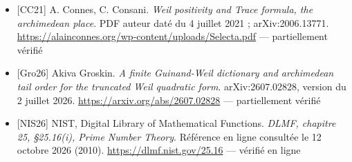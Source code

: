 \documentclass[
  10pt,
  a4paper,
]{article}
\providecommand{\tightlist}{%
  \setlength{\itemsep}{0pt}\setlength{\parskip}{0pt}}
\begin{document}
\begin{itemize}
\tightlist
\item
  {[}CC21{]} A. Connes, C. Consani. \emph{Weil positivity and Trace
  formula, the archimedean place}. PDF auteur daté du 4 juillet 2021 ;
  arXiv:2006.13771.
  \url{https://alainconnes.org/wp-content/uploads/Selecta.pdf} ---
  partiellement vérifié
\item
  {[}Gro26{]} Akiva Groskin. \emph{A finite Guinand-Weil dictionary and
  archimedean tail order for the truncated Weil quadratic form}.
  arXiv:2607.02828, version du 2 juillet 2026.
  \url{https://arxiv.org/abs/2607.02828} --- partiellement vérifié
\item
  {[}NIS26{]} NIST, Digital Library of Mathematical Functions.
  \emph{DLMF, chapitre 25, §25.16(i), Prime Number Theory}. Référence en
  ligne consultée le 12 octobre 2026 (2010).
  \url{https://dlmf.nist.gov/25.16} --- vérifié en ligne
\end{itemize}
\end{document}
